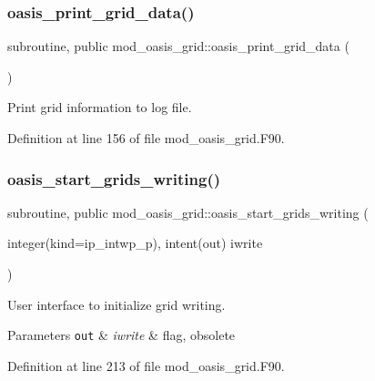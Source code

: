 \subsubsection{\texorpdfstring{oasis\+\_\+print\+\_\+grid\+\_\+data()}{oasis\_print\_grid\_data()}}
{\footnotesize\ttfamily subroutine, public mod\+\_\+oasis\+\_\+grid\+::oasis\+\_\+print\+\_\+grid\+\_\+data (\begin{DoxyParamCaption}{ }\end{DoxyParamCaption})}



Print grid information to log file. 



Definition at line 156 of file mod\+\_\+oasis\+\_\+grid.\+F90.

\mbox{\label{namespacemod__oasis__grid_acb0569d8677f0762559ed6b211945d9b}} 
\subsubsection{\texorpdfstring{oasis\+\_\+start\+\_\+grids\+\_\+writing()}{oasis\_start\_grids\_writing()}}
{\footnotesize\ttfamily subroutine, public mod\+\_\+oasis\+\_\+grid\+::oasis\+\_\+start\+\_\+grids\+\_\+writing (\begin{DoxyParamCaption}\item[{integer(kind=ip\+\_\+intwp\+\_\+p), intent(out)}]{iwrite }\end{DoxyParamCaption})}



User interface to initialize grid writing. 


\begin{DoxyParams}[1]{Parameters}
\mbox{\tt out}  & {\em iwrite} & flag, obsolete \\
\hline
\end{DoxyParams}


Definition at line 213 of file mod\+\_\+oasis\+\_\+grid.\+F90.

\mbox{\label{namespacemod__oasis__grid_a59755e271ccdd0c98807b5938ef33e78}} 
